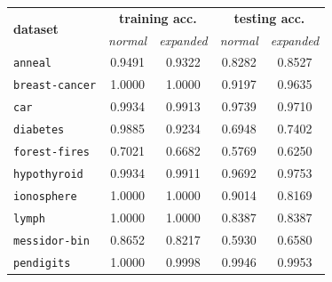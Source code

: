 \documentclass[12pt]{report}
\theoremstyle{definition}
\theoremstyle{definition}
\theoremstyle{definition}
\begin{document}
\begin{table}[ht]
    \centering
    \begin{tabular}{lcccc}
    \hline
    \multicolumn{1}{l}{\multirow{2}{*}{\bf dataset}} & \multicolumn{2}{c}{\bf training acc.} & \multicolumn{2}{c}{\bf testing acc.} \\
    \multicolumn{1}{l}{} & \multicolumn{1}{p{2cm}}{\centering \it normal} & \multicolumn{1}{p{2cm}}{\centering \it expanded} & \multicolumn{1}{p{2cm}}{\centering \it normal} & \multicolumn{1}{p{2cm}}{\centering \it expanded} \\
    \hline
    \multicolumn{1}{l}{\tt anneal}        & \multicolumn{1}{c}{0.9491} & \multicolumn{1}{c}{0.9322} & \multicolumn{1}{c}{0.8282} & \multicolumn{1}{c}{0.8527} \\
    \multicolumn{1}{l}{\tt breast-cancer} & \multicolumn{1}{c}{1.0000} & \multicolumn{1}{c}{1.0000} & \multicolumn{1}{c}{0.9197} & \multicolumn{1}{c}{0.9635} \\
    \multicolumn{1}{l}{\tt car}           & \multicolumn{1}{c}{0.9934} & \multicolumn{1}{c}{0.9913} & \multicolumn{1}{c}{0.9739} & \multicolumn{1}{c}{0.9710} \\
    \multicolumn{1}{l}{\tt diabetes}      & \multicolumn{1}{c}{0.9885} & \multicolumn{1}{c}{0.9234} & \multicolumn{1}{c}{0.6948} & \multicolumn{1}{c}{0.7402} \\
    \multicolumn{1}{l}{\tt forest-fires}  & \multicolumn{1}{c}{0.7021} & \multicolumn{1}{c}{0.6682} & \multicolumn{1}{c}{0.5769} & \multicolumn{1}{c}{0.6250} \\
    \multicolumn{1}{l}{\tt hypothyroid}   & \multicolumn{1}{c}{0.9934} & \multicolumn{1}{c}{0.9911} & \multicolumn{1}{c}{0.9692} & \multicolumn{1}{c}{0.9753} \\
    \multicolumn{1}{l}{\tt ionosphere}    & \multicolumn{1}{c}{1.0000} & \multicolumn{1}{c}{1.0000} & \multicolumn{1}{c}{0.9014} & \multicolumn{1}{c}{0.8169} \\
    \multicolumn{1}{l}{\tt lymph}         & \multicolumn{1}{c}{1.0000} & \multicolumn{1}{c}{1.0000} & \multicolumn{1}{c}{0.8387} & \multicolumn{1}{c}{0.8387} \\
    \multicolumn{1}{l}{\tt messidor-bin}  & \multicolumn{1}{c}{0.8652} & \multicolumn{1}{c}{0.8217} & \multicolumn{1}{c}{0.5930} & \multicolumn{1}{c}{0.6580} \\
    \multicolumn{1}{l}{\tt pendigits}     & \multicolumn{1}{c}{1.0000} & \multicolumn{1}{c}{0.9998} & \multicolumn{1}{c}{0.9946} & \multicolumn{1}{c}{0.9953} \\

\end{tabular}
\end{table}
\end{document}
